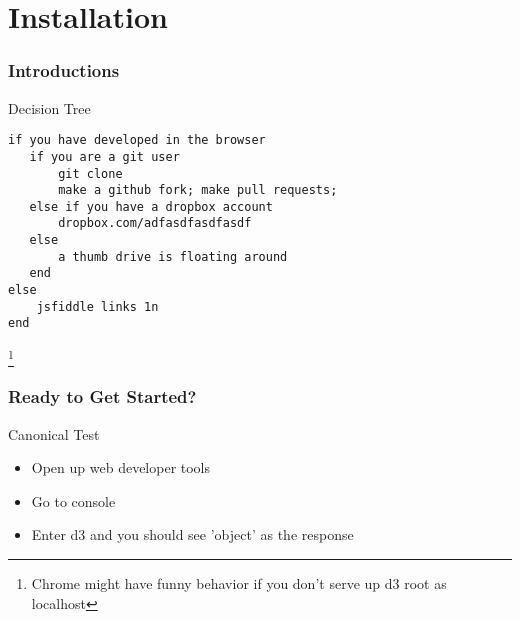\documentclass{beamer}
\begin{document}
\section{Installation}

\begin{frame}[fragile]
    \frametitle{Introductions}
    \begin{block}{Decision Tree}
        \begin{verbatim}
if you have developed in the browser
   if you are a git user
       git clone 
       make a github fork; make pull requests;
   else if you have a dropbox account
       dropbox.com/adfasdfasdfasdf
   else
       a thumb drive is floating around
   end
else
    jsfiddle links 1n
end
        \end{verbatim}
    \end{block}
    \footnote{Chrome might have funny behavior if you don't serve up d3 root as localhost}
\end{frame}


\begin{frame}
    \frametitle{Ready to Get Started?}
    \begin{block}{Canonical Test}
        \begin{itemize}
        \item Open up web developer tools
        \item Go to console
        \item Enter d3 and you should see 'object' as the response
        \end{itemize}
    \end{block}
\end{frame}
\end{document}
